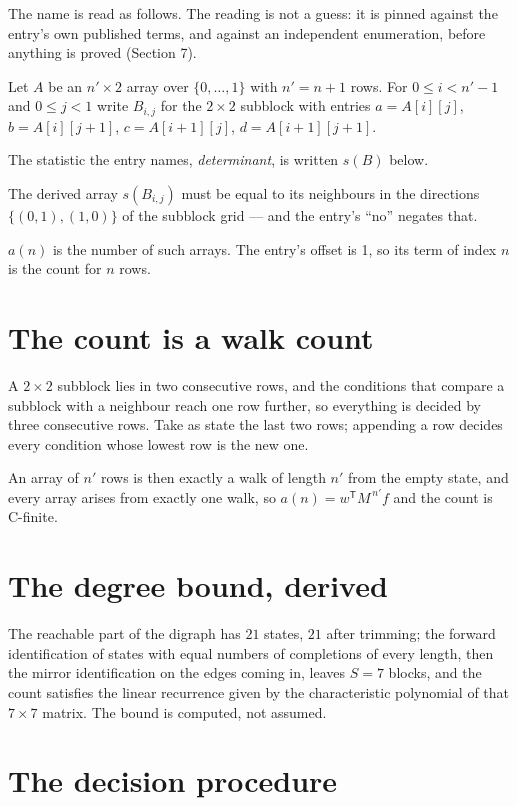 \documentclass[11pt]{article}
\theoremstyle{definition}
\begin{document}
The name is read as follows. The reading is not a guess: it is pinned against the entry's own published terms, and against an independent enumeration, before anything is proved (Section 7).

Let $A$ be an $n' \times 2$ array over $\{0,\dots,1\}$ with $n' = n + 1$ rows. For $0 \le i < n'-1$ and $0 \le j < 1$ write $B_{i,j}$ for the $2\times2$ subblock with entries $a = A[i][j]$, $b = A[i][j{+}1]$, $c = A[i{+}1][j]$, $d = A[i{+}1][j{+}1]$.

The statistic the entry names, {\itshape determinant}, is written $s(B)$ below.

The derived array $s(B_{i,j})$ must be equal to its neighbours in the directions $\{(0,1), (1,0)\}$ of the subblock grid --- and the entry's ``no'' negates that.

$a(n)$ is the number of such arrays. The entry's offset is 1, so its term of index $n$ is the count for $n$ rows.

\section{The count is a walk count}

A $2\times2$ subblock lies in two consecutive rows, and the conditions that compare a subblock with a neighbour reach one row further, so everything is decided by three consecutive rows. Take as state the last two rows; appending a row decides every condition whose lowest row is the new one.

An array of $n'$ rows is then exactly a walk of length $n'$ from the empty state, and every array arises from exactly one walk, so $a(n) = w^{\mathsf T}M^{\,n'}f$ and the count is C-finite.

\section{The degree bound, derived}

The reachable part of the digraph has $21$ states, $21$ after trimming; the forward identification of states with equal numbers of completions of every length, then the mirror identification on the edges coming in, leaves $S = 7$ blocks, and the count satisfies the linear recurrence given by the characteristic polynomial of that $7\times7$ matrix. The bound is computed, not assumed.

\section{The decision procedure}
\end{document}
